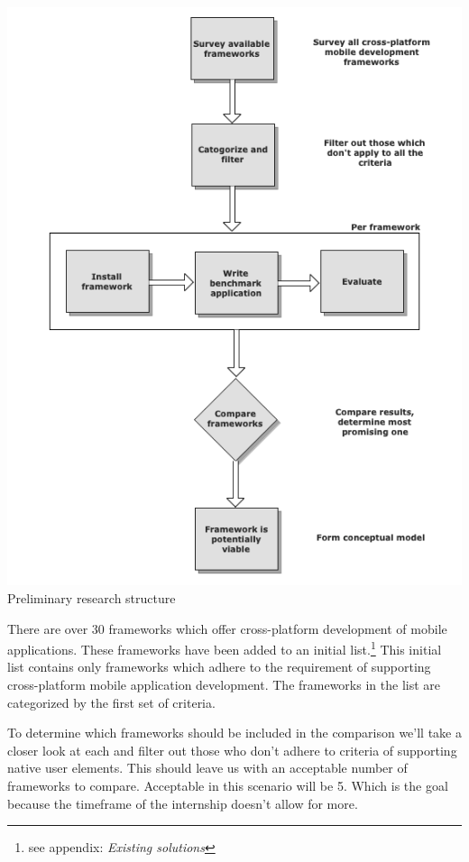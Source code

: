 \begin{centering}
\includegraphics[scale=0.3]{images/preliminary}\\{Preliminary research structure}\\
\end{centering}

There are over 30 frameworks which offer cross-platform development of mobile applications\cite{Wikipedia2012}. These frameworks have been added to an initial list.\footnote{see appendix: \emph{Existing solutions}} This initial list contains only frameworks which adhere to the requirement of supporting cross-platform mobile application development. The frameworks in the list are categorized by the first set of criteria.

To determine which frameworks should be included in the comparison we'll take a closer look at each and filter out those who don't adhere to criteria of supporting native user elements. This should leave us with an acceptable number of frameworks to compare. Acceptable in this scenario will be 5. Which is the goal because the timeframe of the internship doesn't allow for more.



